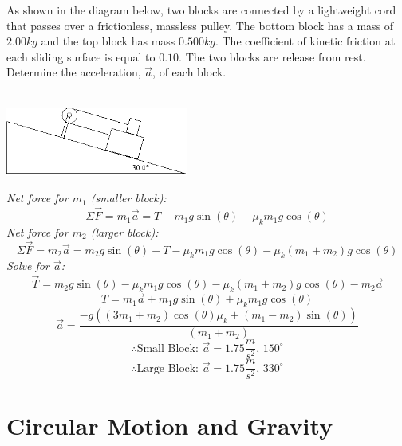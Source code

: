 \documentclass{article}
\begin{document}
  		\begin{multicols}{2}
  			As shown in the diagram below, two blocks are connected by a lightweight cord that passes over a frictionless, massless pulley.  The bottom block has a mass of $2.00 kg$ and the top block has mass $0.500 kg$.  The coefficient of kinetic friction at each sliding surface is equal to $0.10$.  The two blocks are release from rest.  Determine the acceleration, $\vec{a}$, of each block.\\\\
            \vfill
  			\centerline{\includegraphics[width=6cm]{frictionPlane.png}}
  			\vfill
  		\columnbreak
  			\noindent\textit{Net force for $m_1$ (smaller block):}
  			\[
            	\Sigma\vec{F}=m_1\vec{a}=T-m_1 g\sin(\theta)-\mu_km_1g\cos(\theta)
            \]
  			\textit{Net force for $m_2$ (larger block):}
  			\[
            	\Sigma\vec{F}=m_2\vec{a}=m_2g\sin(\theta)-T-\mu_km_1g\cos(\theta)-\mu_k(m_1+m_2)g\cos(\theta)
            \]
            \textit{Solve for $\vec{a}$:}
            \[
            	\vec{T}=m_2g\sin(\theta)-\mu_km_1g\cos(\theta)-\mu_k(m_1+m_2)g\cos(\theta)-m_2\vec{a}
            \]
            \[
            	T=m_1\vec{a}+m_1 g\sin(\theta)+\mu_km_1g\cos(\theta)
            \]
            \[
            	\vec{a}=\frac
                {-g((3m_1+m_2)\cos(\theta)\mu_k+(m_1-m_2)\sin(\theta))}
                {(m_1+m_2)}
            \]
            \[
            	\therefore\text{Small Block: }\vec{a}=1.75\frac{m}{s^2} \text{, $150^{\circ}$}
            \]
            \[
            	\therefore\text{Large Block: }\vec{a}=1.75\frac{m}{s^2} \text{, $330^{\circ}$}
            \]
       	\end{multicols}
          
\section{Circular Motion and Gravity}
  
\end{document}
